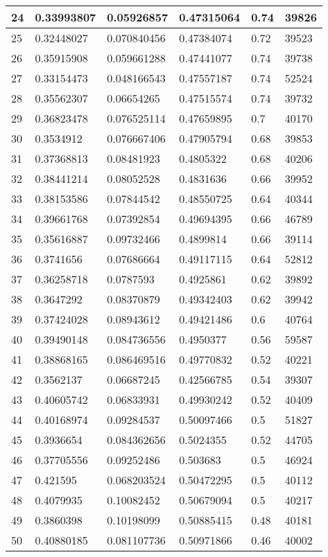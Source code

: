 \begin{longtable}{|l|l|l|l|l|l|}
24 & 0.33993807 & 0.05926857 & 0.47315064 & 0.74 & 39826 \\ \hline 
25 & 0.32448027 & 0.070840456 & 0.47384074 & 0.72 & 39523 \\ \hline 
26 & 0.35915908 & 0.059661288 & 0.47441077 & 0.74 & 39738 \\ \hline 
27 & 0.33154473 & 0.048166543 & 0.47557187 & 0.74 & 52524 \\ \hline 
28 & 0.35562307 & 0.06654265 & 0.47515574 & 0.74 & 39732 \\ \hline 
29 & 0.36823478 & 0.076525114 & 0.47659895 & 0.7 & 40170 \\ \hline 
30 & 0.3534912 & 0.076667406 & 0.47905794 & 0.68 & 39853 \\ \hline 
31 & 0.37368813 & 0.08481923 & 0.4805322 & 0.68 & 40206 \\ \hline 
32 & 0.38441214 & 0.08052528 & 0.4831636 & 0.66 & 39952 \\ \hline 
33 & 0.38153586 & 0.07844542 & 0.48550725 & 0.64 & 40344 \\ \hline 
34 & 0.39661768 & 0.07392854 & 0.49694395 & 0.66 & 46789 \\ \hline 
35 & 0.35616887 & 0.09732466 & 0.4899814 & 0.66 & 39114 \\ \hline 
36 & 0.3741656 & 0.07686664 & 0.49117115 & 0.64 & 52812 \\ \hline 
37 & 0.36258718 & 0.0787593 & 0.4925861 & 0.62 & 39892 \\ \hline 
38 & 0.3647292 & 0.08370879 & 0.49342403 & 0.62 & 39942 \\ \hline 
39 & 0.37424028 & 0.08943612 & 0.49421486 & 0.6 & 40764 \\ \hline 
40 & 0.39490148 & 0.084736556 & 0.4950377 & 0.56 & 59587 \\ \hline 
41 & 0.38868165 & 0.086469516 & 0.49770832 & 0.52 & 40221 \\ \hline 
42 & 0.3562137 & 0.06687245 & 0.42566785 & 0.54 & 39307 \\ \hline 
43 & 0.40605742 & 0.06833931 & 0.49930242 & 0.52 & 40409 \\ \hline 
44 & 0.40168974 & 0.09284537 & 0.50097466 & 0.5 & 51827 \\ \hline 
45 & 0.3936654 & 0.084362656 & 0.5024355 & 0.52 & 44705 \\ \hline 
46 & 0.37705556 & 0.09252486 & 0.503683 & 0.5 & 46924 \\ \hline 
47 & 0.421595 & 0.068203524 & 0.50472295 & 0.5 & 40112 \\ \hline 
48 & 0.4079935 & 0.10082452 & 0.50679094 & 0.5 & 40217 \\ \hline 
49 & 0.3860398 & 0.10198099 & 0.50885415 & 0.48 & 40181 \\ \hline 
50 & 0.40880185 & 0.081107736 & 0.50971866 & 0.46 & 40002 \\ \hline 
\end{longtable}